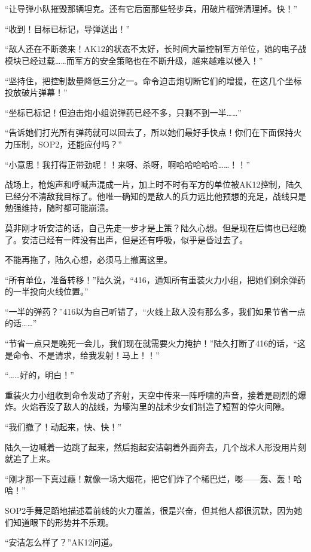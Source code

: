 \section*{}

“让导弹小队摧毁那辆坦克。还有它后面那些轻步兵，用破片榴弹清理掉。快！”

“收到！目标已标记，导弹送出！”

“敌人还在不断袭来！AK12的状态不太好，长时间大量控制军方单位，她的电子战模块已经过载……而军方的安全策略也在不断升级，越来越难以侵入！”

“坚持住，把控制数量降低三分之一。命令迫击炮切断它们的增援，在这几个坐标投放破片弹幕！”

“坐标已标记！但迫击炮小组说弹药已经不多，只剩不到一半……”

“告诉她们打光所有弹药就可以回去了，所以她们最好手快点！你们在下面保持火力压制，SOP2，还能应付吗？”

“小意思！我打得正带劲呢！！来呀、杀呀，啊哈哈哈哈哈……！！”

战场上，枪炮声和呼喊声混成一片，加上时不时有军方的单位被AK12控制，陆久已经分不清敌我目标了。他唯一确知的是敌人的兵力远比他预想的充足，战线只是勉强维持，随时都可能崩溃。

莫非刚才听安洁的话，自己先走一步才是上策？陆久心想。但是现在后悔也已经晚了。安洁已经有一阵没有出声，但是还有呼吸，似乎是昏过去了。

不能再拖了，陆久心想，必须马上撤离这里。

“所有单位，准备转移！”陆久说，“416，通知所有重装火力小组，把她们剩余弹药的一半投向火线位置。”

“一半的弹药？”416以为自己听错了，“火线上敌人没有那么多，我们如果节省一点的话……”

“节省一点只是晚死一会儿，我们现在就需要火力掩护！”陆久打断了416的话，“这是命令、不是请求，给我发射！马上！！”

“……好的，明白！”

重装火力小组收到命令发动了齐射，天空中传来一阵呼啸的声音，接着是剧烈的爆炸。火焰吞没了敌人的战线，为壕沟里的战术少女们制造了短暂的停火间隙。

“我们撤了！动起来，快、快！”

陆久一边喊着一边跳了起来，然后抱起安洁朝着外面奔去，几个战术人形没用片刻就追了上来。

“刚才那一下真过瘾！就像一场大烟花，把它们炸了个稀巴烂，嘭——轰、轰！哈哈！”

SOP2手舞足蹈地描述着前线的火力覆盖，很是兴奋，但其他人都很沉默，因为她们知道眼下的形势并不乐观。

“安洁怎么样了？”AK12问道。

